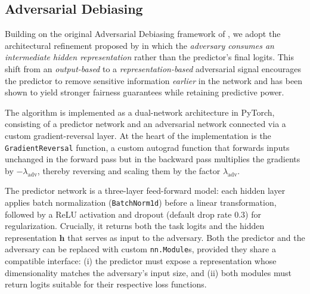 \documentclass[12pt,a4paper,openright,twoside]{book}
\begin{document}
\subsection{Adversarial Debiasing}
Building on the original Adversarial Debiasing framework of \cite{zhang2018mitigatingunwantedbiasesadversarial}, we adopt the architectural refinement proposed by \cite{beutel2017datadecisionstheoreticalimplications} in which the \emph{adversary consumes an intermediate hidden representation} rather than the predictor’s final logits.  This shift from an \textit{output-based} to a \textit{representation-based} adversarial signal encourages the predictor to remove sensitive information \emph{earlier} in the network and has been shown to yield stronger fairness guarantees while retaining predictive power.

The algorithm is implemented as a dual-network architecture in PyTorch, consisting of a predictor network and an adversarial network connected via a custom gradient-reversal layer.  At the heart of the implementation is the \texttt{GradientReversal} function, a custom autograd function that forwards inputs unchanged in the forward pass but in the backward pass multiplies the gradients by $-\lambda_{\text{adv}}$, thereby reversing and scaling them by the factor $\lambda_{\text{adv}}$.  

The predictor network is a three-layer feed-forward model: each hidden layer applies batch normalization (\texttt{BatchNorm1d}) before a linear transformation, followed by a ReLU activation and dropout (default drop rate $0.3$) for regularization.  Crucially, it returns both the task logits and the hidden representation $\mathbf{h}$ that serves as input to the adversary.  Both the predictor and the adversary can be replaced with custom \texttt{nn.Module}s, provided they share a compatible interface: (i) the predictor must expose a representation whose dimensionality matches the adversary’s input size, and (ii) both modules must return logits suitable for their respective loss functions.
\end{document}
